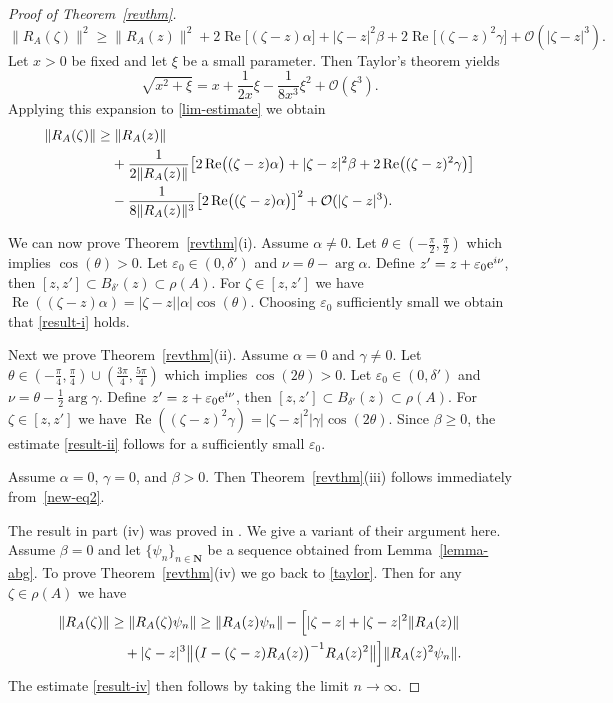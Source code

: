 \documentclass[12pt,a4paper]{article}
\numberwithin{equation}{section}
\theoremstyle{plain}
\theoremstyle{definition}
\newcommand{\abs}[1]{\lvert{#1}\rvert}  %
\newcommand{\norm}[1]{\lVert{#1}\rVert} %
\DeclareMathOperator{\re}{Re} %
\newcommand{\bddz}{B_{\delta'}(z)}
\newcommand{\cO}{\mathcal{O}}
\newcommand{\bN}{\mathbf{N}}
\newcommand{\eps}{\varepsilon}
\DeclareMathOperator{\Arg}{arg}
\newcommand{\e}{\textup{e}}
\begin{document}
\begin{proof}[Proof of Theorem~\ref{revthm}]
	\begin{equation}\label{lim-estimate}
		\norm{R_A(\zeta)}^2 \geq \norm{R_A(z)}^2 + 2\re\bigl[(\zeta-z)\alpha\bigr] + \abs{\zeta-z}^2\beta + 2\re\bigl[(\zeta-z)^2\gamma\bigr] + \cO(\abs{\zeta-z}^3).
	\end{equation}
	Let $x>0$ be fixed and let $\xi$ be a small parameter. Then Taylor's theorem yields
	\begin{equation*}
		\sqrt{x^2+\xi} = x+\frac{1}{2x}\xi - \frac{1}{8x^3}\xi^2 + \cO(\xi^3).
	\end{equation*}
	Applying this expansion to \eqref{lim-estimate} we obtain
	\begin{align}
		\norm{R_A(\zeta)} &\geq \norm{R_A(z)} \notag \\
		&\phantom{={}} + \frac{1}{2\norm{R_A(z)}} \bigl[2\re\bigl((\zeta-z)\alpha\bigr)+\abs{\zeta-z}^2\beta + 2\re\bigl((\zeta-z)^2\gamma\bigr)\bigr] \notag\\
		&\phantom{={}} - \frac{1}{8\norm{R_A(z)}^3} \bigl[2\re\bigl((\zeta-z)\alpha\bigr)\bigr]^2 + \cO(\abs{\zeta-z}^3). \label{new-eq2}
	\end{align}
	
	We can now prove Theorem~\ref{revthm}(i). Assume $\alpha\neq0$. Let $\theta\in(-\tfrac{\pi}{2},\tfrac{\pi}{2})$ which implies $\cos(\theta)>0$. Let $\eps_0\in(0,\delta')$ and $\nu = \theta-\Arg \alpha$. Define $z' = z + \eps_0\e^{i\nu}$, then $[z,z']\subset\bddz\subset\rho(A)$. For $\zeta\in[z,z']$ we have $\re((\zeta-z)\alpha) = \abs{\zeta-z}\abs{\alpha}\cos(\theta)$. Choosing $\eps_0$ sufficiently small we obtain that \eqref{result-i} holds.
	
	Next we prove Theorem~\ref{revthm}(ii). Assume $\alpha=0$ and $\gamma\neq0$. Let $\theta\in(-\tfrac{\pi}{4},\tfrac{\pi}{4})\cup(\tfrac{3\pi}{4},\tfrac{5\pi}{4})$ which implies $\cos(2\theta)>0$. Let $\eps_0\in(0,\delta')$ and $\nu = \theta-\tfrac{1}{2}\Arg \gamma$. Define $z' = z + \eps_0\e^{i\nu}$, then $[z,z']\subset\bddz\subset\rho(A)$. For $\zeta\in[z,z']$ we have $\re((\zeta-z)^2\gamma) = \abs{\zeta-z}^2\abs{\gamma}\cos(2\theta)$. Since $\beta\geq0$, the estimate \eqref{result-ii} follows for a sufficiently small $\eps_0$.
	
	Assume $\alpha=0$, $\gamma=0$, and $\beta>0$. Then Theorem~\ref{revthm}(iii) follows immediately from~\eqref{new-eq2}.
	
	The result in part (iv) was proved in \cite{BS}. We give a variant of their argument here. Assume $\beta=0$ and let $\{\psi_n\}_{n\in\bN}$ be a sequence obtained from Lemma~\ref{lemma-abg}. To prove Theorem~\ref{revthm}(iv) we go back to \eqref{taylor}. Then for any $\zeta\in\rho(A)$ we have
	\begin{align*}
		\norm{R_A(\zeta)}&\geq \norm{R_A(\zeta)\psi_n} \geq\norm{R_A(z)\psi_n} -\Bigl[\abs{\zeta-z}+\abs{\zeta-z}^2\norm{R_A(z)} \\
		&\quad + \abs{\zeta-z}^3\bigl\lVert \bigl(I-(\zeta-z)R_A(z)\bigr)^{-1}R_A(z)^2\bigr \rVert \Bigr]\norm{R_A(z)^2\psi_n}.
	\end{align*}
	The estimate \eqref{result-iv} then follows by taking the limit $n\to\infty$.
\end{proof}
\end{document}
